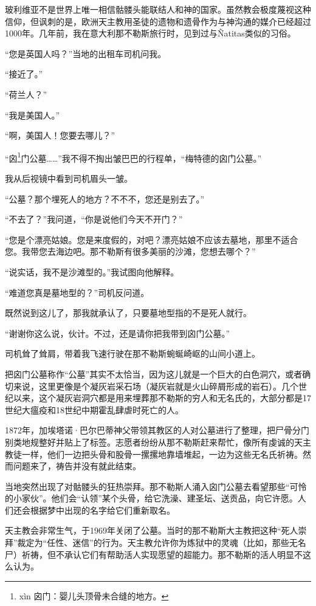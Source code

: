 \documentclass[12pt,oneside]{book}
\begin{document}
\begin{bookref}[frametitle={\cite{好好告别：世界葬礼观察手记}}]
玻利维亚不是世界上唯一相信骷髅头能联结人和神的国家。虽然教会极度蔑视这种信仰，但讽刺的是，欧洲天主教用圣徒的遗物和遗骨作为与神沟通的媒介已经超过1000年。几年前，我在意大利那不勒斯旅行时，见到过与Ñatitas类似的习俗。

“您是英国人吗？”当地的出租车司机问我。

“接近了。”

“荷兰人？”

“我是美国人。”

“啊，美国人！您要去哪儿？”

“囟\footnote{xìn 囟门：婴儿头顶骨未合缝的地方。}门公墓……”我不得不掏出皱巴巴的行程单，“梅特德的囟门公墓。”

我从后视镜中看到司机眉头一皱。

“公墓？那个埋死人的地方？不不不，您还是别去了。”

“不去了？”我问道，“你是说他们今天不开门？”

“您是个漂亮姑娘。您是来度假的，对吧？漂亮姑娘不应该去墓地，那里不适合您。我带您去海边吧。那不勒斯有很多美丽的沙滩，您想去哪个？”

“说实话，我不是沙滩型的。”我试图向他解释。

“难道您真是墓地型的？”司机反问道。

既然说到这儿了，那我就承认了，只要墓地型指的不是死人就行。

“谢谢你这么说，伙计。不过，还是请你把我带到囟门公墓。”

司机耸了耸肩，带着我飞速行驶在那不勒斯蜿蜒崎岖的山间小道上。

把囟门公墓称作“公墓”其实不太恰当，因为这儿就是一个巨大的白色洞穴，或者确切来说，这里更像是个凝灰岩采石场（凝灰岩就是火山碎屑形成的岩石）。几个世纪以来，这个凝灰岩洞穴都是用来埋葬那不勒斯的穷人和无名氏的，大部分都是17世纪大瘟疫和18世纪中期霍乱肆虐时死亡的人。

1872年，加埃塔诺·巴尔巴蒂神父带领其教区的人对公墓进行了整理，把尸骨分门别类地规整好并贴上了标签。志愿者纷纷从那不勒斯赶来帮忙，像所有虔诚的天主教徒一样，他们一边把头骨和股骨一摞摞地靠墙堆起，一边为这些无名氏祈祷。然而问题来了，祷告并没有就此结束。

当地突然出现了对骷髅头的狂热崇拜。那不勒斯人涌入囟门公墓去看望那些“可怜的小家伙”。他们会“认领”某个头骨，给它洗澡、建圣坛、送贡品，向它许愿。人们还会根据梦中出现的名字给它们重新取名。

天主教会非常生气，于1969年关闭了公墓。当时的那不勒斯大主教把这种“死人崇拜”裁定为“任性、迷信”的行为。天主教允许你为炼狱中的灵魂（比如，那些无名尸）祈祷，但不承认它们有帮助活人实现愿望的超能力。那不勒斯的活人明显不这么认为。


\end{bookref}
\end{document}
